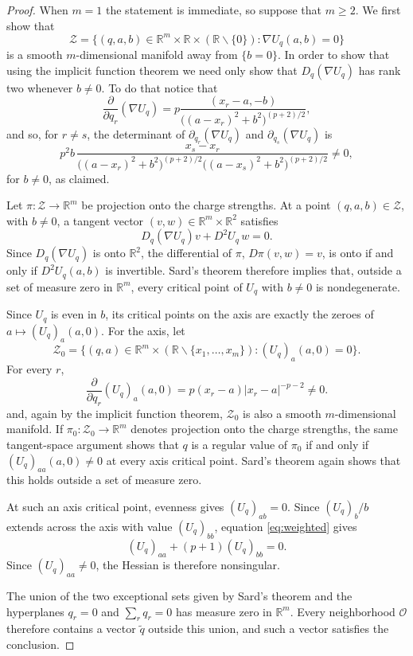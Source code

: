 \documentclass[leqno,11pt]{amsart}
\numberwithin{equation}{section}
\newcommand{\bbR}{\mathbb{R}}
\theoremstyle{definition}
\begin{document}
	\begin{proof}
		When $m=1$ the statement is immediate, so suppose that $m\geq2$. We first show that
		\[
		\mathcal Z=\{(q,a,b)\in\bbR^m\times\bbR \times (\bbR\backslash \{0\}):\nabla U_q(a,b)=0\}
		\]
		is a smooth $m$-dimensional manifold away from $\{b=0\}$. In order to show that using the implicit function theorem we need only show that $D_q(\nabla U_q)$ has rank two whenever $b \neq 0$. To do that notice that
		\[
		\frac{\partial}{\partial q_r } \left(\nabla U_q\right)=p\frac{(x_r-a,-b)}{\big((a-x_r)^2+b^2\big)^{(p+2)/2}},
		\]
		and so, for $r \neq s$, the determinant of $\partial_{q_r}(\nabla U_q)$ and $\partial_{q_s}(\nabla U_q)$ is
		\[
		p^2b\,
		\frac{x_s-x_r}
		{\big((a-x_r)^2+b^2\big)^{(p+2)/2}
			\big((a-x_s)^2+b^2\big)^{(p+2)/2}} \neq 0,
		\]
		for $b \neq 0$, as claimed.
		
		Let $\pi:\mathcal Z\to\bbR^m$ be projection onto the charge strengths. At a point $(q,a,b)\in\mathcal Z$, with $b \neq 0$, a tangent vector $(v,w)\in\bbR^m\times\bbR^2$ satisfies
		\[
		D_q(\nabla U_q)v+D^2U_q\,w=0.
		\]
		Since $D_q(\nabla U_q)$ is onto $\bbR^2$, the differential of $\pi$, $D\pi(v,w)=v$, is onto if and only if $D^2U_q(a,b)$ is invertible. Sard's theorem \cite[Chapter~3]{Hirsch} therefore implies that, outside a set of measure zero in $\bbR^m$, every critical point of $U_q$ with $b \neq 0$ is nondegenerate. 
		
		Since $U_q$ is even in $b$, its critical points on the axis are exactly the zeroes of $a\mapsto(U_q)_a(a,0)$. For the axis, let
		\[
		\mathcal Z_0=\{(q,a)\in\bbR^m\times(\bbR\backslash\{x_1,\ldots,x_m\}):(U_q)_a(a,0)=0\}.
		\]
		For every $r$,
		\[
		\frac{\partial}{\partial q_r}(U_q)_a(a,0)
		=p(x_r-a)|x_r-a|^{-p-2}\neq0.
		\]
		and, again by the implicit function theorem, $\mathcal Z_0$ is also a smooth $m$-dimensional manifold. If $\pi_0:\mathcal Z_0\to\bbR^m$ denotes projection onto the charge strengths, the same tangent-space argument shows that $q$ is a regular value of $\pi_0$ if and only if $(U_q)_{aa}(a,0)\neq0$ at every axis critical point. Sard's theorem again shows that this holds outside a set of measure zero.
		
		At such an axis critical point, evenness gives $(U_q)_{ab}=0$. Since $(U_q)_b/b$ extends across the axis with value $(U_q)_{bb}$, equation \eqref{eq:weighted} gives
		\begin{equation}\label{eq:axis-Hessian-relation}
			(U_q)_{aa}+(p+1)(U_q)_{bb}=0.
		\end{equation}
		Since $(U_q)_{aa}\neq0$, the Hessian is therefore nonsingular.
		
		The union of the two exceptional sets given by Sard's theorem and the hyperplanes $q_r=0$ and $\sum_rq_r=0$ has measure zero in $\bbR^m$. Every neighborhood $\mathcal O$ therefore contains a vector $\widetilde q$ outside this union, and such a vector satisfies the conclusion.
	\end{proof}
	
\end{document}
